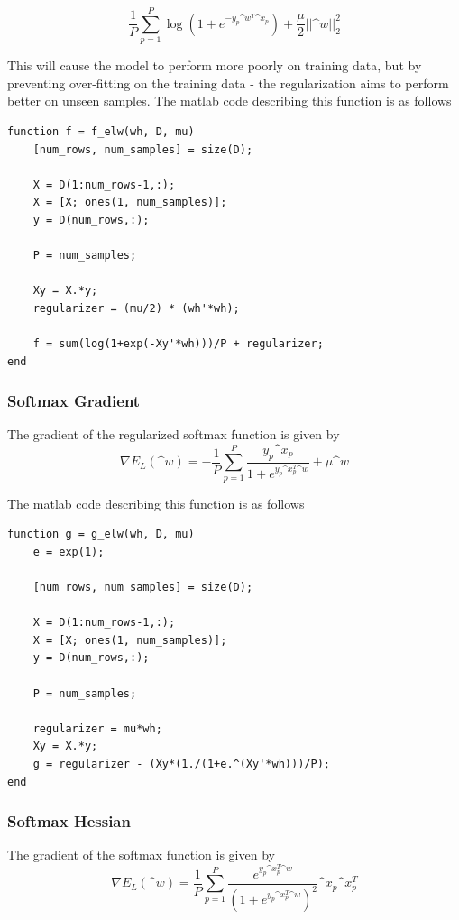 \documentclass[12pt,conference]{IEEEtran}
\begin{document}
$$ \frac{1}{P}\sum_{p=1}^{P} \log\left(1+e^{-y_p\^w^T\^x_p}\right) + \frac{\mu}{2}||\^w||_2^2$$

This will cause the model to perform more poorly on training data, but by preventing over-fitting on the training data - the regularization aims to perform better on unseen samples.
The matlab code describing this function is as follows

\vspace{0.3cm}
\begin{Verbatim}[framesep=3mm]
function f = f_elw(wh, D, mu) 
    [num_rows, num_samples] = size(D);
    
    X = D(1:num_rows-1,:);
    X = [X; ones(1, num_samples)];
    y = D(num_rows,:);
    
    P = num_samples;
    
    Xy = X.*y;
    regularizer = (mu/2) * (wh'*wh);
    
    f = sum(log(1+exp(-Xy'*wh)))/P + regularizer;
end
\end{Verbatim} 
\vspace{0.5cm}


\subsubsection{Softmax Gradient} 
The gradient of the regularized softmax function is given by
$$ \nabla E_L(\^w) = -\frac{1}{P} \sum_{p=1}^P \frac{y_p \^x_p}{1+e^{y_p\^x^T_p \^w}} + \mu\^w$$

The matlab code describing this function is as follows

\vspace{0.3cm}
\begin{Verbatim}[framesep=3mm]
function g = g_elw(wh, D, mu) 
    e = exp(1);
    
    [num_rows, num_samples] = size(D);
    
    X = D(1:num_rows-1,:);
    X = [X; ones(1, num_samples)];
    y = D(num_rows,:);
    
    P = num_samples;
    
    regularizer = mu*wh;
    Xy = X.*y;
    g = regularizer - (Xy*(1./(1+e.^(Xy'*wh)))/P);   
end
\end{Verbatim} 
\vspace{0.5cm}

\subsubsection{Softmax Hessian} 
The gradient of the softmax function is given by
$$ \nabla E_L(\^w) = \frac{1}{P} \sum^P_{p=1} \frac{e^{y_p\^x_p^T\^w}}{\left(1+e^{y_p\^x^T_p \^w}\right)^2} \^x_p\^x_p^T$$
\end{document}
